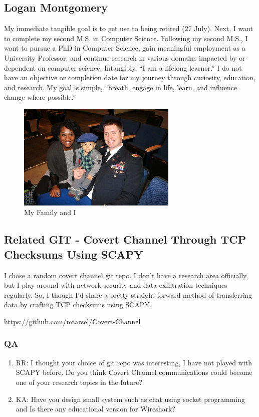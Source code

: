 \subsection{Logan Montgomery}
My immediate tangible goal is to get use to being retired (27 July).  Next, I want to complete my second M.S. in Computer Science.  Following my second M.S., I want to pursue a PhD in Computer Science, gain meaningful employment as a University Professor, and continue research in various domains impacted by or dependent on computer science.  Intangibly, “I am a lifelong learner.”  I do not have an objective or completion date for my journey through curiosity, education, and research.  My goal is simple, “breath, engage in life, learn, and influence change where possible.”

\begin{figure}[ht]
	\centering
    \includegraphics[width=3in]{myimage}
    \caption{My Family and I}
    \label{fig:My Family and I}
\end{figure}

\subsection{Related GIT - Covert Channel Through TCP Checksums Using SCAPY}
I chose a random covert channel git repo.  I don't have a research area officially, but I play around with network security and data exfiltration techniques regularly.  So, I though I'd share a pretty straight forward method of transferring data by crafting TCP checksums using SCAPY.   

\url{https://github.com/mtarsel/Covert-Channel}

\subsubsection{QA}
\begin{enumerate}

	\item RR: I thought your choice of git repo was interesting, I have not played with SCAPY before. Do you think Covert Channel communications could become one of your research topics in the future?
	
        \item KA: Have you design small system such as chat using socket programming and Is there any educational version for Wireshark?

\end{enumerate}
